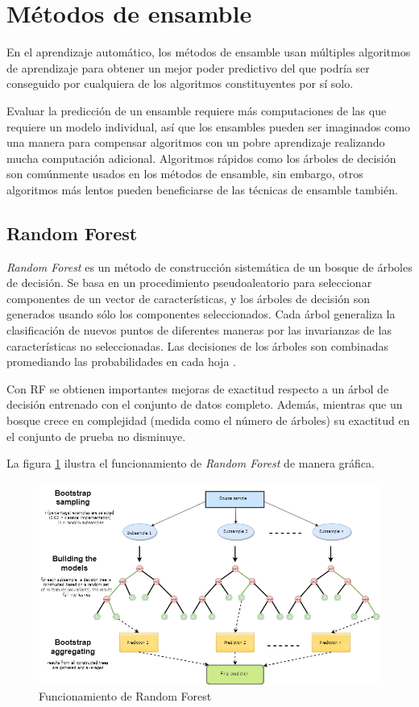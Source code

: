 \section{Métodos de ensamble}

En el aprendizaje automático, los métodos de ensamble usan múltiples algoritmos de aprendizaje para obtener un mejor poder predictivo del que podría ser conseguido por cualquiera de los algoritmos constituyentes por sí solo.

Evaluar la predicción de un ensamble requiere más computaciones de las que requiere un modelo individual, así que los ensambles pueden ser imaginados como una manera para compensar algoritmos con un pobre aprendizaje realizando mucha computación adicional. Algoritmos rápidos como los árboles de decisión son comúnmente usados en los métodos de ensamble, sin embargo, otros algoritmos más lentos pueden beneficiarse de las técnicas de ensamble también.

\subsection{Random Forest}

\textit{Random Forest} es un método de construcción sistemática de un bosque de árboles de decisión. Se basa en un procedimiento pseudoaleatorio para seleccionar componentes de un vector de características, y los árboles de decisión son generados usando sólo los componentes seleccionados. Cada árbol generaliza la clasificación de nuevos puntos de diferentes maneras por las invarianzas de las características no seleccionadas. Las decisiones de los árboles son combinadas promediando las probabilidades en cada hoja \citep{ho1998random}.

Con \ac{RF} se obtienen importantes mejoras de exactitud respecto a un árbol de decisión entrenado con el conjunto de datos completo. Además, mientras que un bosque crece en complejidad (medida como el número de árboles) su exactitud en el conjunto de prueba no disminuye.

La figura \ref{fig:rf} ilustra el funcionamiento de \textit{Random Forest} de manera gráfica.

\begin{figure}[htbp]
	\centering
	\includegraphics[width=\linewidth]{graficos/rf.png}
	\caption{Funcionamiento de Random Forest \citep{mql5:rf}}
	\label{fig:rf}
\end{figure}


